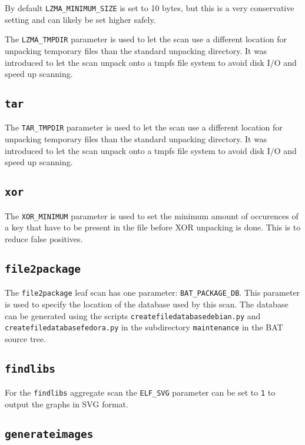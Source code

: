\documentclass[10pt]{article}
\begin{document}
By default \texttt{LZMA\_MINIMUM\_SIZE} is set to 10 bytes, but this is a very
conservative setting and can likely be set higher safely.

The \texttt{LZMA\_TMPDIR} parameter is used to let the scan use a different
location for unpacking temporary files than the standard unpacking directory.
It was introduced to let the scan unpack onto a tmpfs file system to avoid disk
I/O and speed up scanning.

\subsection{\texttt{tar}}

The \texttt{TAR\_TMPDIR} parameter is used to let the scan use a different
location for unpacking temporary files than the standard unpacking directory.
It was introduced to let the scan unpack onto a tmpfs file system to avoid disk
I/O and speed up scanning.

\subsection{\texttt{xor}}

The \texttt{XOR\_MINIMUM} parameter is used to set the minimum amount of
occurences of a key that have to be present in the file before XOR unpacking
is done. This is to reduce false positives.

\subsection{\texttt{file2package}}

The \texttt{file2package} leaf scan has one parameter:
\texttt{BAT\_PACKAGE\_DB}.  This parameter is used to specify the location of
the database used by this scan. The database can be generated using the scripts
\texttt{createfiledatabasedebian.py} and \texttt{createfiledatabasefedora.py}
in the subdirectory \texttt{maintenance} in the BAT source tree.

\subsection{\texttt{findlibs}}

For the \texttt{findlibs} aggregate scan the \texttt{ELF\_SVG} parameter can be
set to \texttt{1} to output the graphs in SVG format.

\subsection{\texttt{generateimages}}
\end{document}
